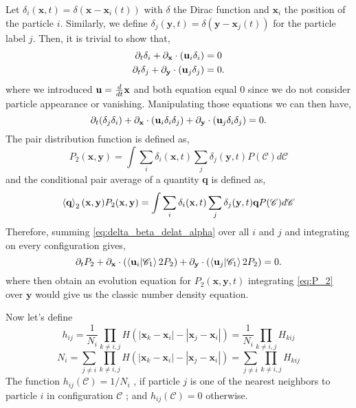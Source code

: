 

Let $\delta_i(\textbf{x},t) = \delta(\textbf{x} - \textbf{x}_i(t))$ with $\delta$ the Dirac function and $\textbf{x}_i$ the position of the particle $i$.  
Similarly, we define $\delta_j(\textbf{y},t) =\delta(\textbf{y} - \textbf{x}_j(t)) $ for the particle label $j$. 
Then, it is trivial to show that, 
\begin{align*}
    \partial_t \delta_i + \partial_\textbf{x} \cdot (\textbf{u}_i \delta_i) &= 0\\
    \partial_t \delta_j + \partial_\textbf{y} \cdot (\textbf{u}_j \delta_j) &= 0.
\end{align*}
where we introduced $\textbf{u} = \frac{d}{d t} \textbf{x}$
and both equation equal $0$ since we do not consider particle appearance or vanishing. 
Manipulating those equations we can then have, 
\begin{equation}
    \partial_t (\delta_j\delta_i) + \partial_\textbf{x} \cdot (\textbf{u}_i \delta_i\delta_j) + \partial_\textbf{y} \cdot (\textbf{u}_j \delta_i\delta_j) = 0.
    \label{eq:delta_beta_delat_alpha}
\end{equation}
The pair distribution function is defined as,
\begin{equation}
    P_2(\textbf{x},\textbf{y}) = \int \sum_i\delta_i(\textbf{x},t) \sum_j\delta_j(\textbf{y},t) P(\mathscr{C})d\mathscr{C}
\end{equation}
and the conditional pair average of a quantity \textbf{q} is defined as, 
\begin{equation}
    \left<\textbf{q}\right>_2(\textbf{x},\textbf{y})P_2(\textbf{x},\textbf{y}) = \int \sum_i\delta_i(\textbf{x},t) \sum_j\delta_j(\textbf{y},t) \textbf{q} P(\mathscr{C})d\mathscr{C}
\end{equation}
Therefore, summing \ref{eq:delta_beta_delat_alpha} over all $i$ and $j$ and integrating on every configuration gives, 
\begin{equation}
    \partial_t P_2 + \partial_\textbf{x} \cdot (\left<\textbf{u}_i | \mathscr{C}_1\right>{2}P_2) + \partial_\textbf{y} \cdot (\left<\textbf{u}_j | \mathscr{C}_1\right>{2}P_2) = 0.
    \label{eq:P_2}
\end{equation}
where then obtain an evolution equation for $P_2(\textbf{x},\textbf{y},t)$
integrating \ref{eq:P_2} over $\textbf{y}$ would give us the classic number density equation. 

Now let's define 
\begin{equation*}
    h_{ij} 
    = \frac{1}{N_i}
    \prod_{k \neq i,j}
    H(|\textbf{x}_k - \textbf{x}_i| - |\textbf{x}_j - \textbf{x}_i|)
    = \frac{1}{N_i}
    \prod_{k \neq i,j}
    H_{kij}
\end{equation*}
\begin{equation*}
    N_i
    = 
    \sum_{j\neq i}
    \prod_{k \neq i,j}
    H(|\textbf{x}_k - \textbf{x}_i| - |\textbf{x}_j - \textbf{x}_i|)
    = 
    \sum_{j\neq i}
    \prod_{k \neq i,j}
    H_{kij}
\end{equation*}
The function $h_{ij} (\mathscr{C}) = 1/N_i$ , if particle $j$ is one
of the nearest neighbors to particle $i$ in configuration $\mathscr{C}$ ;
and $h_{ij} (\mathscr{C} ) = 0$ otherwise.


